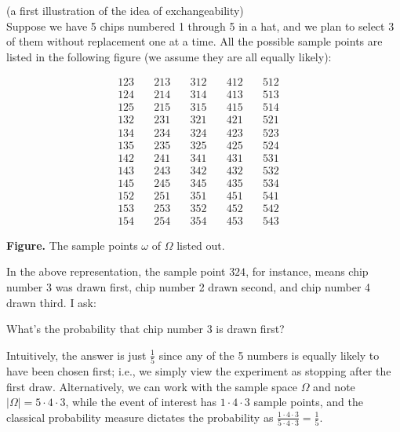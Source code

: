 \documentclass[12pt]{article}
\begin{document}
 (a first illustration of the idea of exchangeability)\label{exchangeability2}\\
Suppose we have 5 chips numbered 1 through 5 in a hat, and we plan to select 3 of them without replacement one at a time.
All the possible sample points are listed in the following figure (we assume they are all equally likely):

$$\begin{array}{rrrrr}
123\quad &213\quad &312\quad &412\quad &512\quad \\
124\quad &214\quad &314\quad &413\quad &513\quad \\
125\quad &215\quad &315\quad &415\quad &514\quad \\
132\quad &231\quad &321\quad &421\quad &521\quad \\
134\quad &234\quad &324\quad &423\quad &523\quad \\
135\quad &235\quad &325\quad &425\quad &524\quad \\
142\quad &241\quad &341\quad &431\quad &531\quad \\
143\quad &243\quad &342\quad &432\quad &532\quad \\
145\quad &245\quad &345\quad &435\quad &534\quad \\
152\quad &251\quad &351\quad &451\quad &541\quad \\
153\quad &253\quad &352\quad &452\quad &542\quad \\
154\quad &254\quad &354\quad &453\quad &543\quad \end{array}$$
\begin{center}{\bf Figure.} The sample points $\omega$ of $\Omega$ listed out.\end{center}

\noindent In the above representation, the sample point $324$, for instance, means chip number 3 was drawn first, chip number 2 drawn second,
and chip number 4 drawn third.  I ask:
\begin{center}What's the probability that chip number 3 is drawn first?\end{center}
\noindent Intuitively, the answer is just $\frac 15$ since any of the 5 numbers is equally likely to have been chosen first; i.e., we simply view the experiment as stopping after the first draw. Alternatively, we can work with the sample space $\Omega$ and note $|\Omega|=5\cdot 4\cdot 3$, while the event of interest has $1\cdot 4\cdot 3$ sample points, and the classical probability measure dictates the probability as $\frac {1\cdot 4\cdot 3}{5\cdot 4\cdot 3}=\frac 15$.\\
\end{document}
